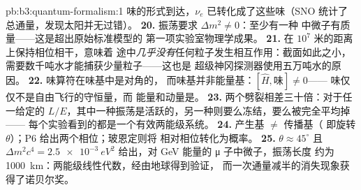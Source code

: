 \begin{solution}{pb:b3:quantum-formalism:1}
味的形式到达，$\nu_e$ 已转化成了这些味（SNO 统计了
总通量，发现太阳并无过错）。
\textbf{20.} 振荡要求 $\Delta m^2 \neq 0$：至少有一种
中微子有质量——这是超出原始标准模型的
第一项实验室物理学成果。
\textbf{21.} 在 $10^7$ 米的距离上保持相位相干，意味着
途中\emph{几乎没有}任何粒子发生相互作用：截面如此之小，
需要数千吨水才能捕获少量粒子——这也是
超级神冈探测器使用五万吨水的原因。
\textbf{22.} 味算符在味基中是对角的，
而味基并非能量基：$[\hat H, \text{味}] \neq 0$——
味仅仅不是自由飞行的守恒量，而
能量和动量是。
\textbf{23.} 两个劈裂相差三十倍：对于任一给定的
$L/E$，其中一种振荡是活跃的，另一种则要么冻结，要么被完全平均掉——
每个实验看到的都是一个有效两能级系统。
\textbf{24.} 产生基 $\neq$ 传播基（
即旋转 $\theta$）；P6 给出两个相位；玻恩定则将
相对相位转化为概率。
\textbf{25.} $\theta \approx 45^\circ$ 且 $\Delta m^2c^4 =
\qty{2.5e-3}{eV^2}$ 给出，对 GeV 能量的 μ 子中微子，振荡长度
约为 \qty{1000}{km}：两能级线性代数，经由地球得到验证，
而一次通量减半的消失现象获得了诺贝尔奖。
\end{solution}

